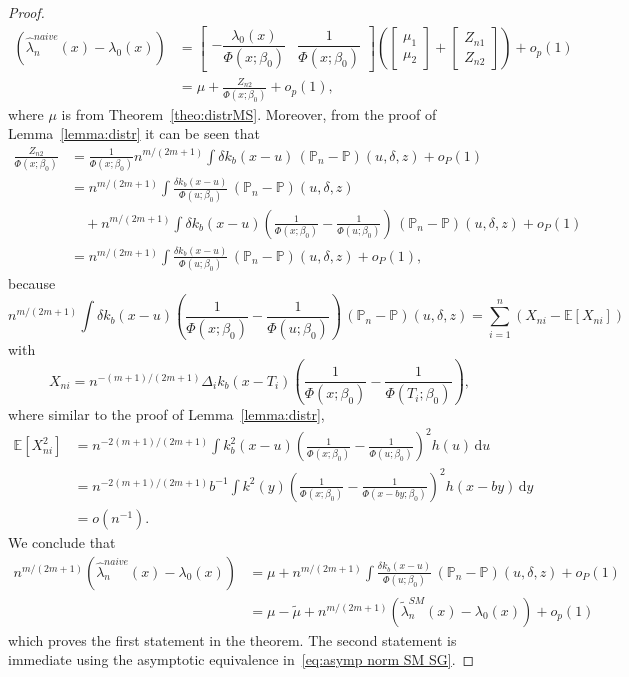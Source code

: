 \documentclass[11pt,reqno]{amsart}
\theoremstyle{definition}
\theoremstyle{plain}
\theoremstyle{remark}
\begin{document}
\begin{proof}
\[\begin{split}
\left(
\hat{\lambda}_n^{naive}(x)-\lambda_0(x)
\right)
&=
\begin{bmatrix}
  -\dfrac{\lambda_0(x)}{\Phi(x;\beta_0)} & \dfrac1{\Phi(x;\beta_0)}
\end{bmatrix}
\left(
\begin{bmatrix}
\mu_1\\
\mu_2
\end{bmatrix}
+
\begin{bmatrix}
Z_{n1}\\
Z_{n2}
\end{bmatrix}
\right)
+
o_p(1)\\
&=
\mu
+
\frac{Z_{n2}}{\Phi(x;\beta_0)}
+
o_p(1),
\end{split}
\]
where $\mu$ is from Theorem~\ref{theo:distrMS}.
Moreover, from the proof of Lemma~\ref{lemma:distr} it can be seen that
\[
\begin{split}
\frac{Z_{n2}}{\Phi(x;\beta_0)}
&=
\frac1{\Phi(x;\beta_0)}
n^{m/(2m+1)}
\int \delta k_b(x-u)\,({\mathbb{P}}_n-{\mathbb{P}})(u,\delta,z)+o_P(1)\\
&=
n^{m/(2m+1)}
\int \frac{\delta k_b(x-u)}{\Phi(u;\beta_0)}\,({\mathbb{P}}_n-{\mathbb{P}})(u,\delta,z)\\
&\quad
+
n^{m/(2m+1)}
\int \delta k_b(x-u)
\left(
\frac{1}{\Phi(x;\beta_0)}
-
\frac{1}{\Phi(u;\beta_0)}
\right)
\,({\mathbb{P}}_n-{\mathbb{P}})(u,\delta,z)+o_P(1)\\
&=
n^{m/(2m+1)}
\int \frac{\delta k_b(x-u)}{\Phi(u;\beta_0)}\,({\mathbb{P}}_n-{\mathbb{P}})(u,\delta,z)
+o_P(1),
\end{split}
\]
because
\[
n^{m/(2m+1)}
\int \delta k_b(x-u)
\left(
\frac{1}{\Phi(x;\beta_0)}
-
\frac{1}{\Phi(u;\beta_0)}
\right)
\,({\mathbb{P}}_n-{\mathbb{P}})(u,\delta,z)
=
\sum_{i=1}^n
\left(
X_{ni}-{\mathbb{E}}\left[X_{ni}\right]
\right)
\]
with
\[
X_{ni}
=
n^{-(m+1)/(2m+1)}
\Delta_i k_b(x-T_i)
\left(
\frac{1}{\Phi(x;\beta_0)}
-
\frac{1}{\Phi(T_i;\beta_0)}
\right),
\]
where similar to the proof of Lemma~\ref{lemma:distr},
\[
\begin{split}
{\mathbb{E}}\left[X_{ni}^2\right]
&=
n^{-2(m+1)/(2m+1)}
\int k_b^2(x-u)
\left(
\frac{1}{\Phi(x;\beta_0)}
-
\frac{1}{\Phi(u;\beta_0)}
\right)^2 h(u)\,\mathrm{d}u\\
&=
n^{-2(m+1)/(2m+1)}b^{-1}
\int k^2(y)
\left(
\frac{1}{\Phi(x;\beta_0)}
-
\frac{1}{\Phi(x-by;\beta_0)}
\right)^2 h(x-by)\,\mathrm{d}y\\
&=
o(n^{-1}).
\end{split}
\]
We conclude that
\[
\begin{split}
n^{m/(2m+1)}
\left(
\hat{\lambda}_n^{naive}(x)-\lambda_0(x)
\right)
&=
\mu
+
n^{m/(2m+1)}
\int \frac{\delta k_b(x-u)}{\Phi(u;\beta_0)}\,({\mathbb{P}}_n-{\mathbb{P}})(u,\delta,z)
+o_P(1)\\
&=
\mu-\widetilde{\mu}
+
n^{m/(2m+1)}
\left(
\tilde{\lambda}^{SM}_n(x)-\lambda_0(x)
\right)
+
o_p(1)
\end{split}
\]
which proves the first statement in the theorem.
The second statement is immediate using the asymptotic equivalence in~\eqref{eq:asymp norm SM SG}.
\end{proof}
\end{document}
